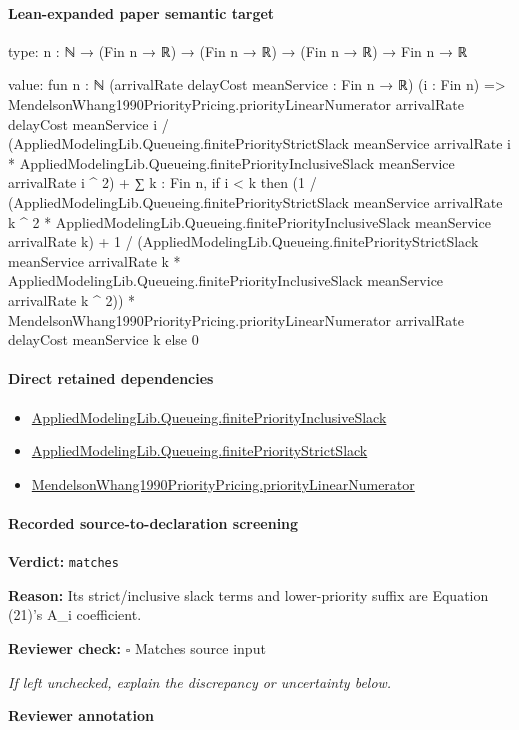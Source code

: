 \documentclass[10pt]{article}
\newcommand{\reviewerbox}{%
  \par\noindent\fbox{\parbox{0.96\linewidth}{\rule{0pt}{0.38in}}}\par
}
\newcommand{\reviewmatch}[1]{%
  \par\noindent\textbf{Reviewer check:} $\square$\; #1\par
  \noindent\emph{If left unchecked, explain the discrepancy or uncertainty below.}\par
}
\begin{document}
\paragraph{Lean-expanded paper semantic target}
\begin{ReviewVerbatim}
type:
{n : ℕ} → (Fin n → ℝ) → (Fin n → ℝ) → (Fin n → ℝ) → Fin n → ℝ

value:
fun {n : ℕ} (arrivalRate delayCost meanService : Fin n → ℝ) (i : Fin n) =>
  MendelsonWhang1990PriorityPricing.priorityLinearNumerator arrivalRate delayCost meanService i /
      (AppliedModelingLib.Queueing.finitePriorityStrictSlack meanService arrivalRate i *
        AppliedModelingLib.Queueing.finitePriorityInclusiveSlack meanService arrivalRate i ^ 2) +
    ∑ k : Fin n,
      if i < k then
        (1 /
              (AppliedModelingLib.Queueing.finitePriorityStrictSlack meanService arrivalRate k ^ 2 *
                AppliedModelingLib.Queueing.finitePriorityInclusiveSlack meanService arrivalRate k) +
            1 /
              (AppliedModelingLib.Queueing.finitePriorityStrictSlack meanService arrivalRate k *
                AppliedModelingLib.Queueing.finitePriorityInclusiveSlack meanService arrivalRate k ^ 2)) *
          MendelsonWhang1990PriorityPricing.priorityLinearNumerator arrivalRate delayCost meanService k
      else 0
\end{ReviewVerbatim}

\paragraph{Direct retained dependencies}
\begin{itemize}\raggedright
\item \hyperlink{governing-declaration-f2b9a1af307e7469}{Applied\allowbreak{}Modeling\allowbreak{}Lib.\allowbreak{}Queueing.\allowbreak{}finite\allowbreak{}Priority\allowbreak{}Inclusive\allowbreak{}Slack}
\item \hyperlink{governing-declaration-3f5cf610a8190094}{Applied\allowbreak{}Modeling\allowbreak{}Lib.\allowbreak{}Queueing.\allowbreak{}finite\allowbreak{}Priority\allowbreak{}Strict\allowbreak{}Slack}
\item \hyperlink{governing-declaration-96f4c7bfcd6904cc}{Mendelson\allowbreak{}Whang1990\allowbreak{}Priority\allowbreak{}Pricing.\allowbreak{}priority\allowbreak{}Linear\allowbreak{}Numerator}
\end{itemize}
\paragraph{Recorded source-to-declaration screening}
\textbf{Verdict:} \texttt{matches}
\\
{\raggedright
\textbf{Reason:} Its strict/\allowbreak{}inclusive slack terms and lower-\allowbreak{}priority suffix are Equation (21)'s A\_\allowbreak{}i coefficient.\allowbreak{}
\par}
\reviewmatch{Matches source input}
\noindent\textbf{Reviewer annotation}\par
\reviewerbox
\clearpage
\hypertarget{paper-prerequisite-1840b9f7b498b425}{}
\end{document}
